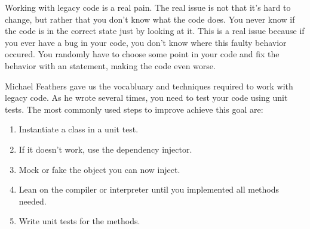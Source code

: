 Working with legacy code is a real pain. The real issue is not that it's hard to change, but rather that you don't know what the code does. You never know if the code is in the correct state just by looking at it. This is a real issue because if you ever have a bug in your code, you don't know where this faulty behavior occured. You randomly have to choose some point in your code and fix the behavior with an  statement, making the code even worse.

Michael Feathers gave us the vocabluary and techniques required to work with legacy code. As he wrote several times, you need to test your code using unit tests. The most commonly used steps to improve achieve this goal are:
\begin{enumerate}
    \item Instantiate a class in a unit test.
    \item If it doesn't work, use the dependency injector.
    \item Mock or fake the object you can now inject.
    \item Lean on the compiler or interpreter until you implemented all methods needed.
    \item Write unit tests for the methods.
\end{enumerate}

